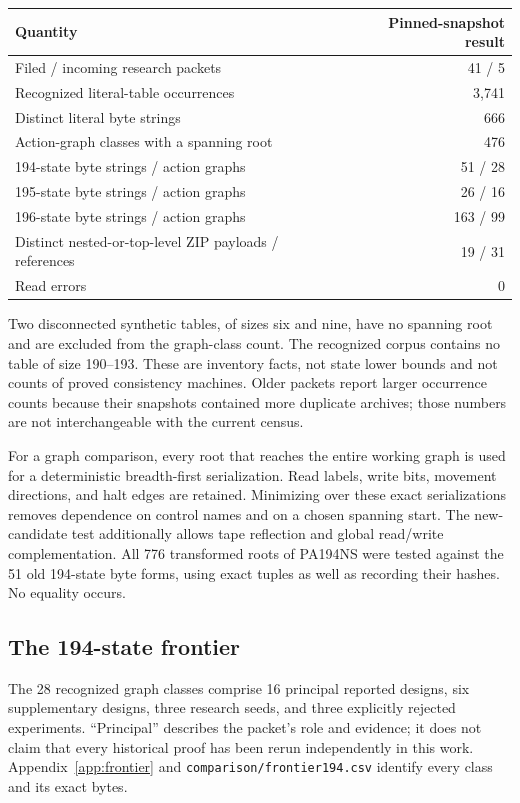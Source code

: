 \documentclass[11pt,letterpaper]{article}
\newcommand{\file}[1]{\texttt{\nolinkurl{#1}}}
\begin{document}
\begin{center}
\begin{tabular}{@{}lr@{}}
\toprule
Quantity & Pinned-snapshot result\\\midrule
Filed / incoming research packets &41 / 5\\
Recognized literal-table occurrences &3,741\\
Distinct literal byte strings &666\\
Action-graph classes with a spanning root &476\\
194-state byte strings / action graphs &51 / 28\\
195-state byte strings / action graphs &26 / 16\\
196-state byte strings / action graphs &163 / 99\\
Distinct nested-or-top-level ZIP payloads / references &19 / 31\\
Read errors &0\\
\bottomrule
\end{tabular}
\end{center}
Two disconnected synthetic tables, of sizes six and nine, have no
spanning root and are excluded from the graph-class count. The recognized
corpus contains no table of size 190--193. These are inventory facts,
not state lower bounds and not counts of proved consistency machines.
Older packets report larger occurrence counts because their snapshots
contained more duplicate archives; those numbers are not interchangeable
with the current census.

For a graph comparison, every root that reaches the entire working graph
is used for a deterministic breadth-first serialization. Read labels,
write bits, movement directions, and halt edges are retained. Minimizing
over these exact serializations removes dependence on control names and
on a chosen spanning start. The new-candidate test additionally allows
tape reflection and global read/write complementation. All 776 transformed
roots of PA194NS were tested against the 51 old 194-state byte forms,
using exact tuples as well as recording their hashes. No equality occurs.

\subsection{The 194-state frontier}

The 28 recognized graph classes comprise 16 principal reported designs,
six supplementary designs, three research seeds, and three explicitly
rejected experiments. ``Principal'' describes the packet's role and
evidence; it does not claim that every historical proof has been rerun
independently in this work. Appendix~\ref{app:frontier} and
\file{comparison/frontier194.csv} identify every class and its exact bytes.
\end{document}
